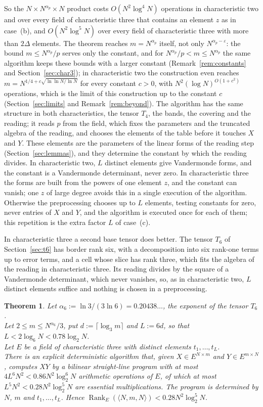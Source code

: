 \documentclass[11pt]{article}
\newtheorem{theorem}{Theorem}[section]
\theoremstyle{definition}
\theoremstyle{remark}
\newcommand{\Rank}{\operatorname{Rank}}
\newcommand{\eps}{\varepsilon}
\begin{document}
So the $N\times N^{\alpha_p}\times N$ product costs $O(N^2\log^4N)$ operations in characteristic two and over every field of characteristic three that contains an element $z$ as in case~(b), and $O(N^2\log^5N)$ over every field of characteristic three with more than $2\Delta$ elements. The theorem reaches $m=N^{\alpha_p}$ itself, not only $N^{\alpha_p-\eps}$: the bound $m\le N^{\alpha_p}/p$ serves only the constant, and for $N^{\alpha_p}/p<m\le N^{\alpha_p}$ the same algorithm keeps these bounds with a larger constant (Remark~\ref{rem:constants} and Section~\ref{sec:char3}); in characteristic two the construction even reaches $m=N^{1/4+c\sqrt{\ln\ln N/\ln N}}$ for every constant $c>0$, with $N^2(\log N)^{O(1+c^2)}$ operations, which is the limit of this construction up to the constant $c$ (Section~\ref{sec:limits} and Remark~\ref{rem:beyond}). The algorithm has the same structure in both characteristics, the tensor $T_4$, the bands, the covering and the reading; it reads $p$ from the field, which fixes the parameters and the truncated algebra of the reading, and chooses the elements of the table before it touches $X$ and $Y$. These elements are the parameters of the linear forms of the reading step (Section~\ref{sec:lemmas}), and they determine the constant by which the reading divides. In characteristic two, $L$ distinct elements give Vandermonde forms, and the constant is a Vandermonde determinant, never zero. In characteristic three the forms are built from the powers of one element $z$, and the constant can vanish; one $z$ of large degree avoids this in a single execution of the algorithm. Otherwise the preprocessing chooses up to $L$ elements, testing constants for zero, never entries of $X$ and $Y$, and the algorithm is executed once for each of them; this repetition is the extra factor $L$ of case~(c).

In characteristic three a second base tensor does better. The tensor $T_6$ of Section~\ref{sec:t6} has border rank six, with a decomposition into six rank-one terms up to error terms, and a cell whose slice has rank three, which fits the algebra of the reading in characteristic three. Its reading divides by the square of a Vandermonde determinant, which never vanishes, so, as in characteristic two, $L$ distinct elements suffice and nothing is chosen in a preprocessing.

\begin{theorem}\label{thm:t6}
Let $\alpha_6:=\ln3/(3\ln6)=0.20438\ldots$, the exponent of the tensor $T_6$.\\
Let $2\le m\le N^{\alpha_6}/3$, put $d:=\lceil\log_3m\rceil$ and $L:=6d$, so that $L<2\log_6N<0.78\log_2N$.\\
Let $E$ be a field of characteristic three with distinct elements $t_1,\dots,t_L$.\\
There is an explicit deterministic algorithm that, given $X\in E^{N\times m}$ and $Y\in E^{m\times N}$, computes $XY$ by a bilinear straight-line program with at most $4L^6N^2<0.86N^2\log_2^6N$ arithmetic operations of $E$, of which at most $L^5N^2<0.28N^2\log_2^5N$ are essential multiplications. The program is determined by $N$, $m$ and $t_1,\dots,t_L$. Hence $\Rank_E(\langle N,m,N\rangle)<0.28N^2\log_2^5N$.
\end{theorem}
\end{document}
